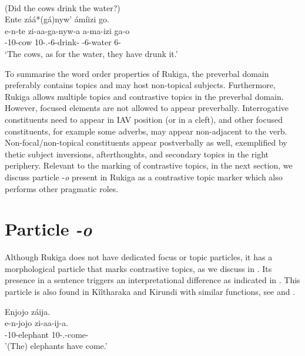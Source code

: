 \documentclass[output=paper]{langscibook}
\begin{document}
\ea
\label{bkm:Ref116294567}
\citep[9]{AsiimwevanderWal2021}\\
(Did the cows drink the water?)\\
Ente záá*(gá)nyw’ ámíizi go.\\
\gll
e-n-te  zi-aa-ga-nyw-a  a-ma-izi  ga-o\\
\AUG{}-10-cow  10\SM{}-\N{}.\PST{}-6\OM{}-drink-\FV{}  \AUG{}-6-water  6-\CM{}\\
\glt
`The cows, as for the water, they have drunk it.’\\


\z


To summarise the word order properties of Rukiga, the preverbal domain preferably contains topics and may host non-topical subjects. Furthermore, Rukiga allows multiple topics and contrastive topics in the preverbal domain. However, focused elements are not allowed to appear preverbally. Interrogative constituents need to appear in IAV position (or in a cleft), and other focused constituents, for example some adverbs, may appear non-adjacent to the verb. Non-focal/non-topical constituents appear postverbally as well, exemplified by thetic subject inversions, afterthoughts, and secondary topics in the right periphery. Relevant to the marking of contrastive topics, in the next section, we discuss particle -\textit{o} present in Rukiga as a contrastive topic marker which also performs other pragmatic roles.

\section{Particle \textit{-o}}\label{sec:particle-o}
Although Rukiga does not have dedicated focus or topic particles, it has a morphological particle that marks contrastive topics, as we discuss in \citet{AsiimwevanderWal2021}. Its presence in a sentence triggers an interpretational difference as indicated in . This particle is also found in Kîîtharaka and Kirundi with similar functions, see \textcite{chapters/kiitharaka} and \textcite{chapters/kirundi}.

\ea
\label{bkm:Ref111495084}
\ea
Enjojo  záija.\\
\gll
e-n-jojo  zi-aa-ij-a.\\
\AUG{}-10-elephant  10\SM{}-\N{}.\PST{}-come-\FV{}\\
\glt
'(The) elephants have come.'\\
\end{document}
